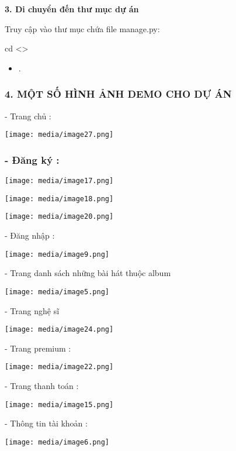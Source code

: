 \documentclass{article}
\begin{document}
\textbf{3. Di chuyển đến thư mục dự án}

Truy cập vào thư mục chứa file manage.py:

cd \textless\textgreater{}

\begin{itemize}
\item
  .
\end{itemize}

\subsubsection{\texorpdfstring{\textbf{4. MỘT SỐ HÌNH ẢNH DEMO CHO DỰ
ÁN}}{4. MỘT SỐ HÌNH ẢNH DEMO CHO DỰ ÁN}}\label{mux1ed9t-sux1ed1-huxecnh-ux1ea3nh-demo-cho-dux1ef1-uxe1n}

- Trang chủ :

\texttt{[image: media/image27.png]}

\subsubsection{\texorpdfstring{\textbf{-} Đăng ký :
}{- Đăng ký : }}\label{ux111ux103ng-kuxfd}

\texttt{[image: media/image17.png]}

\texttt{[image: media/image18.png]}

\texttt{[image: media/image20.png]}

- Đăng nhập :

\texttt{[image: media/image9.png]}

- Trang danh sách những bài hát thuộc album

\texttt{[image: media/image5.png]}

- Trang nghệ sĩ

\texttt{[image: media/image24.png]}

- Trang premium :

\texttt{[image: media/image22.png]}

- Trang thanh toán :

\texttt{[image: media/image15.png]}

- Thông tin tài khoản :

\texttt{[image: media/image6.png]}
\end{document}

